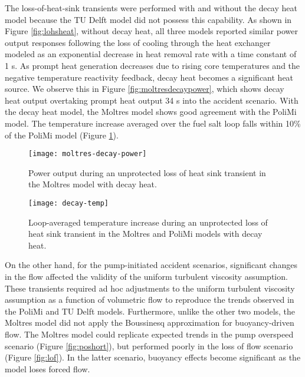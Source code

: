 The loss-of-heat-sink transients were performed with and without the decay heat
model because the TU Delft model did not possess this capability. As shown in
Figure \ref{fig:lohsheat}, without decay heat, all three models reported
similar power output responses following the loss of cooling through the heat
exchanger modeled as an exponential decrease in heat removal rate with a time
constant of 1 s. As prompt heat generation decreases due to rising core
temperatures and the negative temperature reactivity feedback, decay heat
becomes a significant heat source. We observe this in Figure
\ref{fig:moltresdecaypower}, which shows decay heat output overtaking prompt
heat output 34 s into the accident scenario. With the decay heat model, the
Moltres model shows good agreement with the PoliMi model. The temperature
increase averaged over the fuel salt loop falls within 10\% of the PoliMi
model (Figure \ref{fig:polimidecaytemp}).

\begin{figure}[htb!]
	\centering
	\begin{minipage}[t]{0.485\columnwidth}
	    \texttt{[image: moltres-decay-power]}
	    \caption{Power output during
    an unprotected loss of heat sink transient in the Moltres model with
    decay heat.}
	    \label{fig:moltresdecaypower}
	\end{minipage}
	\hfill
	\begin{minipage}[t]{0.485\columnwidth}
	    \texttt{[image: decay-temp]}
	    \caption{Loop-averaged temperature increase during
    an unprotected loss of heat sink transient in the Moltres and PoliMi
    models \cite{fiorina_modelling_2014} with decay heat.}
	    \label{fig:polimidecaytemp}
	\end{minipage}
\end{figure}

On the other hand, for the pump-initiated accident scenarios, significant
changes in the flow affected the validity of the uniform turbulent viscosity
assumption. These transients required ad hoc adjustments to the uniform
turbulent viscosity assumption as a function of volumetric flow to reproduce
the trends observed in the PoliMi and TU Delft models. Furthermore, unlike the
other two models, the Moltres model did not apply the Boussinesq approximation
for buoyancy-driven flow. The Moltres model could replicate expected trends in
the pump overspeed scenario (Figure \ref{fig:poshort}), but performed
poorly in the loss of flow scenario (Figure \ref{fig:lof}). In the latter
scenario, buoyancy effects become significant as the model loses forced flow.

